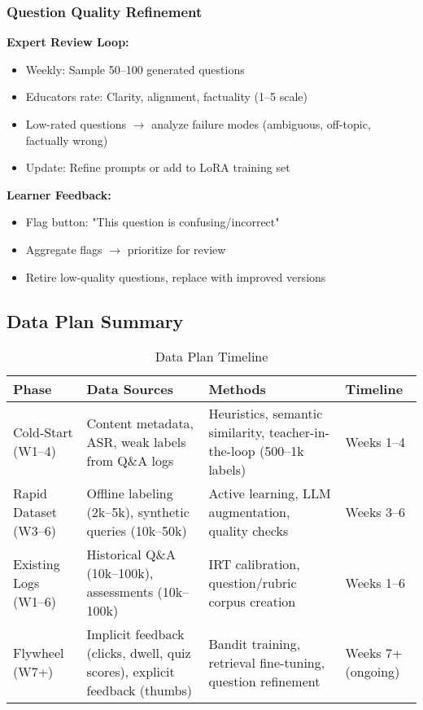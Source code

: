 \documentclass[11pt,letterpaper]{article}
\begin{document}
\subsubsection{Question Quality Refinement}\label{subsubsec:question-quality-refinement}

\textbf{Expert Review Loop:}
\begin{itemize}
\item Weekly: Sample 50--100 generated questions
\item Educators rate: Clarity, alignment, factuality (1--5 scale)
\item Low-rated questions $\rightarrow$ analyze failure modes (ambiguous, off-topic, factually wrong)
\item Update: Refine prompts or add to LoRA training set
\end{itemize}

\textbf{Learner Feedback:}
\begin{itemize}
\item Flag button: "This question is confusing/incorrect"
\item Aggregate flags $\rightarrow$ prioritize for review
\item Retire low-quality questions, replace with improved versions
\end{itemize}

\subsection{Data Plan Summary}\label{subsec:data-plan-summary}

\begin{table}[H]
\centering
\small
\begin{tabular}{@{}p{3cm}p{4cm}p{4cm}p{3cm}@{}}
\toprule
\textbf{Phase} & \textbf{Data Sources} & \textbf{Methods} & \textbf{Timeline} \\
\midrule
Cold-Start (W1--4) & Content metadata, ASR, weak labels from Q\&A logs & Heuristics, semantic similarity, teacher-in-the-loop (500--1k labels) & Weeks 1--4 \\
Rapid Dataset (W3--6) & Offline labeling (2k--5k), synthetic queries (10k--50k) & Active learning, LLM augmentation, quality checks & Weeks 3--6 \\
Existing Logs (W1--6) & Historical Q\&A (10k--100k), assessments (10k--100k) & IRT calibration, question/rubric corpus creation & Weeks 1--6 \\
Flywheel (W7+) & Implicit feedback (clicks, dwell, quiz scores), explicit feedback (thumbs) & Bandit training, retrieval fine-tuning, question refinement & Weeks 7+ (ongoing) \\
\bottomrule
\end{tabular}
\caption{Data Plan Timeline}
\end{table}
\end{document}
